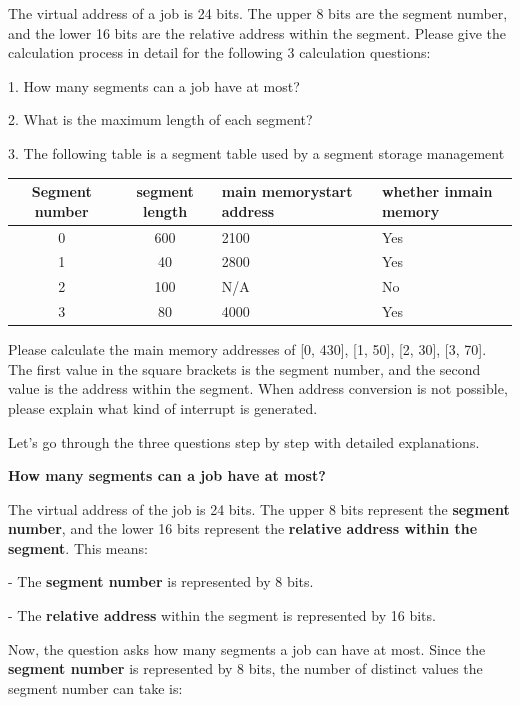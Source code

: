 \documentclass[a4paper]{book}
\begin{document}
\begin{greenbox}
The virtual address of a job is 24 bits. The upper 8 bits are the segment number, and the lower 16 bits are the relative address within the segment.
Please give the calculation process in detail for the following 3 calculation questions:

1. How many segments can a job have at most?

2. What is the maximum length of each segment?

3. The following table is a segment table used by a segment storage management

\vspace{0.5cm}
\begin{tabular}{|c|c|p{3cm}|p{3cm}|}
    \hline
    Segment number & segment length & main memory\newline start address & whether in\newline main memory \\ \hline
    0   & 600   & 2100  & Yes \\ \hline
    1   & 40    & 2800  & Yes \\ \hline
	2   & 100   & N/A   & No  \\ \hline
	3   & 80    & 4000  & Yes \\ \hline
\end{tabular}
\vspace{0.5cm}

Please calculate the main memory addresses of [0, 430], [1, 50], [2, 30], [3, 70]. The first value in the square brackets is the segment number, and the second value is the address within the segment. When address conversion is not possible, please explain what kind of interrupt is generated.
\end{greenbox}

Let's go through the three questions step by step with detailed explanations.

\textbf{How many segments can a job have at most?}

The virtual address of the job is 24 bits. The upper 8 bits represent the \textbf{segment number}, and the lower 16 bits represent the \textbf{relative address within the segment}. This means:

- The \textbf{segment number} is represented by 8 bits.

- The \textbf{relative address} within the segment is represented by 16 bits.

Now, the question asks how many segments a job can have at most. Since the \textbf{segment number} is represented by 8 bits, the number of distinct values the segment number can take is:
\end{document}
